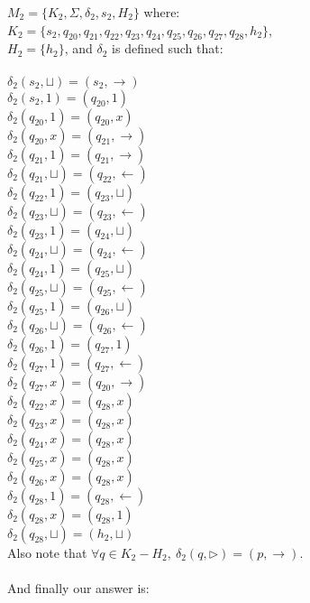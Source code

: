 \documentclass[12pt]{article}
\begin{document}
$M_2 = \{K_2, \Sigma, \delta_2, s_2, H_2\}$ where:\\
$K_2 = \{s_2, q_{20}, q_{21}, q_{22}, q_{23}, q_{24}, 
 q_{25}, q_{26}, q_{27}, q_{28}, h_2\}$,\\
$H_2 = \{h_2\}$, and $\delta_2$ is defined 
such that:\\ \\
$\delta_2(s_2, \sqcup) = (s_2, \rightarrow)$\\
$\delta_2(s_2, 1) = (q_{20}, 1)$\\
$\delta_2(q_{20}, 1) = (q_{20}, x)$\\
$\delta_2(q_{20}, x) = (q_{21}, \rightarrow)$\\
$\delta_2(q_{21}, 1) = (q_{21}, \rightarrow)$\\
$\delta_2(q_{21}, \sqcup) = (q_{22}, \leftarrow)$\\
$\delta_2(q_{22}, 1) = (q_{23}, \sqcup)$\\
$\delta_2(q_{23}, \sqcup) = (q_{23}, \leftarrow)$\\
$\delta_2(q_{23}, 1) = (q_{24}, \sqcup)$\\
$\delta_2(q_{24}, \sqcup) = (q_{24}, \leftarrow)$\\
$\delta_2(q_{24}, 1) = (q_{25}, \sqcup)$\\
$\delta_2(q_{25}, \sqcup) = (q_{25}, \leftarrow)$\\
$\delta_2(q_{25}, 1) = (q_{26}, \sqcup)$\\
$\delta_2(q_{26}, \sqcup) = (q_{26}, \leftarrow)$\\
$\delta_2(q_{26}, 1) = (q_{27}, 1)$\\
$\delta_2(q_{27}, 1) = (q_{27}, \leftarrow)$\\
$\delta_2(q_{27}, x) = (q_{20}, \rightarrow)$\\
$\delta_2(q_{22}, x) = (q_{28}, x)$\\
$\delta_2(q_{23}, x) = (q_{28}, x)$\\
$\delta_2(q_{24}, x) = (q_{28}, x)$\\
$\delta_2(q_{25}, x) = (q_{28}, x)$\\
$\delta_2(q_{26}, x) = (q_{28}, x)$\\
$\delta_2(q_{28}, 1) = (q_{28}, \leftarrow)$\\
$\delta_2(q_{28}, x) = (q_{28}, 1)$\\
$\delta_2(q_{28}, \sqcup) = (h_2, \sqcup)$\\

Also note that $\forall q \in K_2 - H_2,\ \delta_2(q, \triangleright) = (p, \rightarrow).$
\\ \\
And finally our answer is:\\
\end{document}
